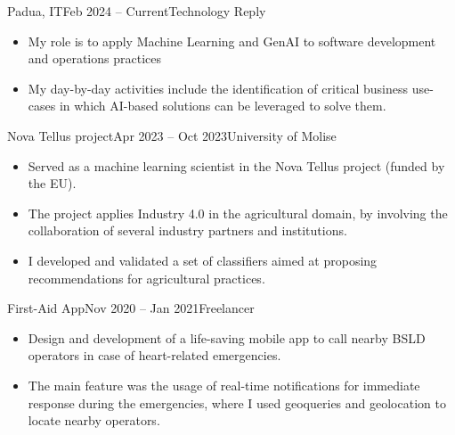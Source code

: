 
	{Padua, IT}{Feb 2024 – Current}{Technology Reply}{\footnotesize{} \hspace{1pt}
	}
	\begin{itemize}
		\item My role is to apply Machine Learning and GenAI to software development and operations practices
		\item My day-by-day activities include the identification of critical business use-cases in which AI-based solutions can be leveraged to solve them.
	\end{itemize}
		
	\medskip

		{Nova Tellus project}{Apr 2023 – Oct 2023}{University of Molise}{\footnotesize{} \hspace{1pt}
		}
	\begin{itemize}
            \item Served as a machine learning scientist in the Nova Tellus project (funded by the EU).
            \item The project applies Industry 4.0 in the agricultural domain, by involving the collaboration of several industry partners and institutions.
            \item I developed and validated a set of classifiers aimed at proposing recommendations for agricultural practices.
	\end{itemize}
	
	\medskip

		{First-Aid App}{Nov 2020 – Jan 2021}{Freelancer}{\footnotesize{} \hspace{1pt}
		}
	\begin{itemize}
            \item Design and development of a life-saving mobile app to call nearby BSLD operators in case of heart-related emergencies.
            \item The main feature was the usage of real-time notifications for immediate response during the emergencies, where I used geoqueries and geolocation to locate nearby operators. 
	\end{itemize}
        	
